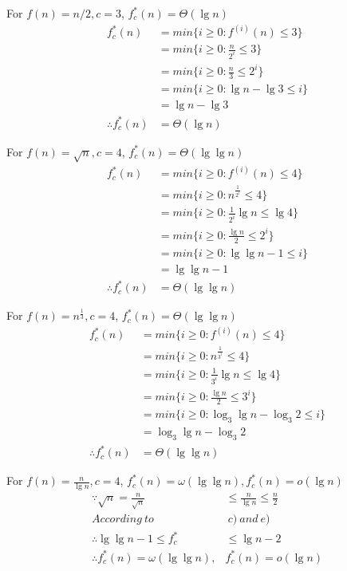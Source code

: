 \documentclass[12pt,letterpaper]{article}
\begin{document}
\begin{enumerate}
For $f(n) = n / 2 , c = 3 $, $f_c^*(n) = \Theta(\lg n)$
\begin{align*}
f_c^*(n) &= min \{ i \ge 0: f^{(i)}(n) \le 3 \} \\
&= min \{ i \ge 0: \frac{n}{2^i} \le 3 \} \\
&= min \{ i \ge 0:  \frac{n}{3} \le 2^i \} \\
&= min \{ i \ge 0: \lg n - \lg 3 \le i \} \\
&= \lg n - \lg 3 \\
\therefore f_c^*(n) &= \Theta(\lg n)
\end{align*}

For $f(n) = \sqrt{n} , c = 4 $, $f_c^*(n) = \Theta(\lg \lg n)$
\begin{align*}
f_c^*(n) &= min \{ i \ge 0: f^{(i)}(n) \le 4 \} \\
&= min \{ i \ge 0: n ^ {\frac{1}{2^i}} \le 4 \} \\
&= min \{ i \ge 0: \frac{1}{2^i} \lg n \le \lg 4 \} \\
&= min \{ i \ge 0: \frac{\lg n}{2} \le 2^i \} \\
&= min \{ i \ge 0: \lg \lg n - 1 \le i \} \\
&= \lg \lg n - 1 \\
\therefore f_c^*(n) &= \Theta(\lg \lg n)
\end{align*}

For $f(n) = n ^{\frac{1}{3}}, c = 4 $, $f_c^*(n) = \Theta(\lg \lg n) $
\begin{align*}
f_c^*(n) &= min \{ i \ge 0: f^{(i)}(n) \le 4 \} \\
&= min \{ i \ge 0: n ^ {\frac{1}{3^i}} \le 4 \} \\
&= min \{ i \ge 0: \frac{1}{3^i} \lg n \le \lg 4 \} \\
&= min \{ i \ge 0: \frac{\lg n}{2} \le 3^i \} \\
&= min \{ i \ge 0: \log_3 \lg n - \log_3 2 \le i \} \\
&= \log_3 \lg n - \log_3 2 \\
\therefore f_c^*(n) &= \Theta(\lg \lg n)
\end{align*}

For $ f(n) = \frac{n}{\lg n}, c = 4 $, $f_c^*(n) = \omega(\lg \lg n), f_c^*(n) = o(\lg n)$
\begin{align*}
\because \sqrt{n} = \frac{n}{\sqrt{n}} &\le \frac{n}{\lg n} \le \frac{n}{2} \\
According \ to \ & \ c) \ and \ e) \\
\therefore  \lg \lg n - 1 \le f_c^*&  \le \lg n - 2 \\
\therefore f_c^*(n) = \omega(\lg \lg n), & f_c^*(n) = o(\lg n)
\end{align*}

\end{enumerate}
\end{document}
